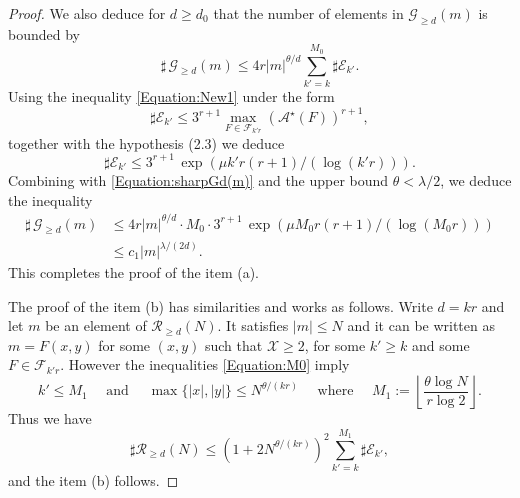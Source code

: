 \documentclass[10pt,a4paper]{amsart}
\begin{document}
\begin{proof}
We also deduce for $d\geqslant d_0$ that the number of elements in $\mathcal G_{\geqslant d} (m)$ is bounded by
\begin{equation}\label{Equation:sharpGd(m)}
\sharp \, \mathcal G_{\geqslant d} (m) \leqslant 4r \vert m \vert^{\theta/d} \sum_{k'=k}^{M_0} \sharp \mathcal E_{k'}. 
\end{equation}
Using the inequality \eqref{Equation:New1} under the form 
\[
\sharp \mathcal E_{k'} \leqslant 3^{r+1} \max_{F\in \mathcal F_{k'r}} (\mathcal A^\star(F))^{r+1},
\]
together with the hypothesis (2.3) we deduce 
\[
\sharp \mathcal E_{k'} \leqslant 3^{r+1}\, \exp \left(\mu k' r(r+1) /(\log (k'r))\right). 
\]
Combining with \eqref{Equation:sharpGd(m)} and the upper bound $\theta<\lambda/2$, we deduce 
the inequality
\begin{align*}
\sharp \, \mathcal G_{\geqslant d} (m) &\leqslant 4r \vert m \vert^{\theta/d} \cdot 
M_0 \cdot 3^{r+1}\, \exp \left(\mu M_0 r(r+1) /(\log (M_0r))\right) \\
& \leqslant c_1 \vert m\vert^{\lambda/(2d)}.
\end{align*} 
This completes the proof of the item (a).

The proof of the item (b) has similarities and works as follows. Write $d=kr$ and let $m$ be an element of $\mathcal R_{\geqslant d}(N)$.
It satisfies $\vert m \vert \leqslant N$ and it can be written as 
$m= F(x,y)$ for some $(x,y)$ such that $ \mathcal X \geqslant 2$, for some $k'\geqslant k$ and some $F\in \mathcal F_{k'r}$.
However the inequalities \eqref{Equation:M0} imply
\[
k'\leqslant M_1\quad \text{ and } \quad \max\{|x|,|y|\} \leqslant N^{\theta/(kr)}
\quad \text{ where } \quad 
M_1:=
\left\lfloor
 \frac{\theta \log N}{r\log 2} \right\rfloor.
\]
Thus we have
\[
\sharp \mathcal R_{\geqslant d} (N)\leqslant \left(1+2 N^{\theta/(kr)}\right)^2 \sum_{k'=k}^{M_1} \sharp \mathcal E_{k'},
\]
and the item (b) follows.
\end{proof}
\end{document}
